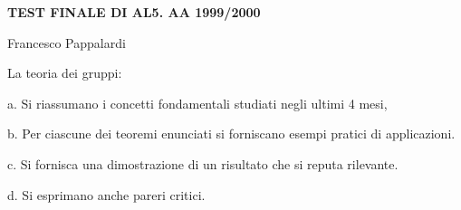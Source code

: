 
\nopagenumbers

\centerline{\bf TEST FINALE DI AL5. AA 1999/2000}
\bigskip
\centerline{Francesco Pappalardi}\bigskip\bigskip

La teoria dei gruppi:

\item{a.} Si riassumano i concetti fondamentali
studiati negli ultimi 4 mesi,
\item{b.} Per ciascune dei teoremi enunciati si forniscano
esempi pratici di applicazioni.
\item{c.}  Si fornisca una dimostrazione di un risultato che
si reputa rilevante.
\item{d.}
 Si esprimano anche pareri critici.

\bye 

